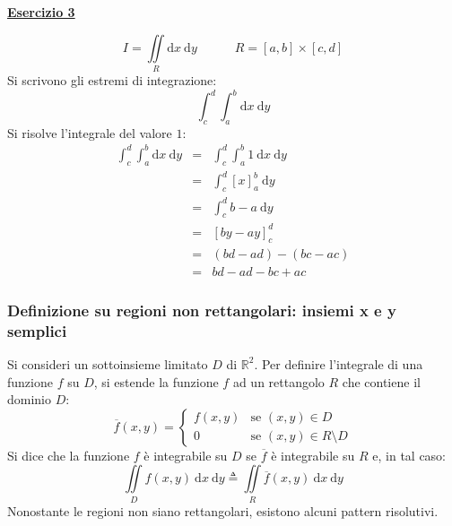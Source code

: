 \documentclass[a4paper]{article}
\newcommand{\example}[1]{\textcolor{Green4}{\textbf{#1}}}
\begin{document}
	\begin{flushleft}
		\example{\underline{Esercizio 3}}
	\end{flushleft}
	\begin{equation*}
		I = \displaystyle\iint \limits_{R} \mathrm{d}x \: \mathrm{d}y \hspace{3em} R = \left[a,b\right] \times \left[c,d\right]
	\end{equation*}
	Si scrivono gli estremi di integrazione:
	\begin{equation*}
		\displaystyle\int_{c}^{d}\int_{a}^{b} \mathrm{d}x \: \mathrm{d}y
	\end{equation*}
	Si risolve l'integrale del valore $1$:
	\begin{equation*}
		\begin{array}{rcl}
			\displaystyle\int_{c}^{d}\int_{a}^{b} \mathrm{d}x \: \mathrm{d}y 
			&=& 
			\displaystyle\int_{c}^{d}\int_{a}^{b} 1 \: \mathrm{d}x \: \mathrm{d}y \\ [1.5em]
			&=&
			\displaystyle\int_{c}^{d} \left[x\right]_{a}^{b} \:\mathrm{d}y \\ [1.5em]
			&=&
			\displaystyle\int_{c}^{d} b-a \:\mathrm{d}y \\ [1.5em]
			&=&
			\left[by-ay\right]_{c}^{d} \\ [1.5em]
			&=&
			\left(bd - ad\right) - \left(bc - ac\right) \\ [1.5em]
			&=&
			bd - ad - bc + ac
		\end{array}
	\end{equation*}\newpage

	\subsubsection{Definizione su regioni non rettangolari: insiemi x e y semplici}\label{subsubsection: definizione su regioni non rettangolari: insiemi x e y semplici}

	Si consideri un sottoinsieme limitato $D$ di $\mathbb{R}^{2}$. Per definire l'integrale di una funzione $f$ su $D$, si estende la funzione $f$ ad un rettangolo $R$ che contiene il dominio $D$:
	\begin{equation*}
		\overline{f}\left(x,y\right) 
		= 
		\begin{cases}
			f\left(x,y\right) 	& \text{se } \left(x,y\right) \in D \\
			0					& \text{se } \left(x,y\right) \in R \setminus D
		\end{cases}
	\end{equation*}
	Si dice che la funzione $f$ è integrabile su $D$ se $\overline{f}$ è integrabile su $R$ e, in tal caso:
	\begin{equation*}
		\iint \limits_{D} f\left(x,y\right) \:\mathrm{d}x \: \mathrm{d}y \triangleq \iint \limits_{R} \overline{f}\left(x,y\right) \:\mathrm{d}x \: \mathrm{d}y
	\end{equation*}
	Nonostante le regioni non siano rettangolari, esistono alcuni pattern risolutivi.
\end{document}
